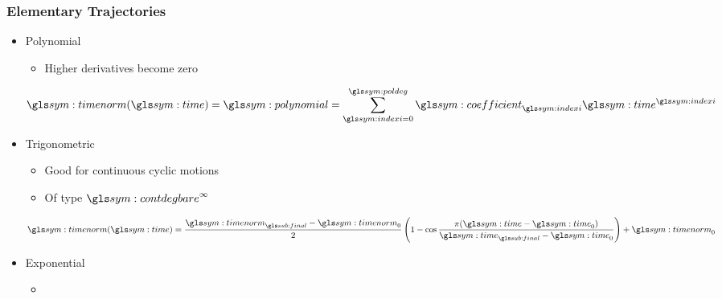\documentclass{beamer}
\begin{document}
	\begin{frame}
		\frametitle{Elementary Trajectories}

		\begin{itemize}

			\item

				Polynomial

				\begin{itemize}



					\item

						Higher derivatives become zero

				\end{itemize}

				\begin{equation}
					\timenorm(\timesym)
						= \polynomial
						= \sum_{\indexi=0}^{\poldeg}
						\coefficient_{\indexi} \timesym^{\indexi}
				\end{equation}

			\item

				Trigonometric

				\begin{itemize}

					\item

						Good for continuous cyclic motions

					\item

						Of type $\contdeg{\infty}$
				\end{itemize}

				\begin{equation}
					\timenorm(\timesym) =
						\frac{%
								\timenorm_{\final} - \timenorm_0
							}
							{%
								2
							}
						\left(
							1 - \cos
								\frac{%
										\pi(\timesym - \timesym_0)
									}
									{%
										\timesym_{\final} - \timesym_0
									}
						\right)
						+ \timenorm_0
				\end{equation}

			\item

				Exponential

				\begin{itemize}

					\item


\end{itemize}
\end{itemize}
\end{frame}
\end{document}
